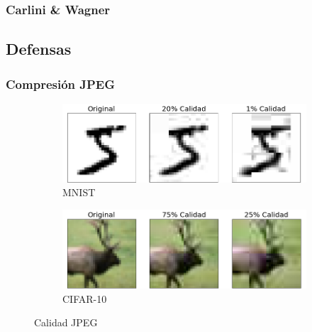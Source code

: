 \subsubsection{Carlini \& Wagner}
\cite{carlini2017evaluating} 

\subsection{Defensas}

\subsubsection{Compresión JPEG}

\begin{figure}[h]
    \centering
    \begin{subfigure}[b]{0.48\textwidth}
        \centering
        \includegraphics[width=\textwidth]{images/mnist/jpeg_qual_mnist.png}
        \caption{MNIST}
        \label{jpeg_cal_mnist}
    \end{subfigure}
    \hfill
    \begin{subfigure}[b]{0.48\textwidth}
        \centering
        \includegraphics[width=\textwidth]{images/cifar-10/jpeg_qual_cifar.png}
        \caption{CIFAR-10}
        \label{jpeg_cal_cifar}
    \end{subfigure}
    \caption{Calidad JPEG}
    \label{cal_JPEG}
\end{figure}


